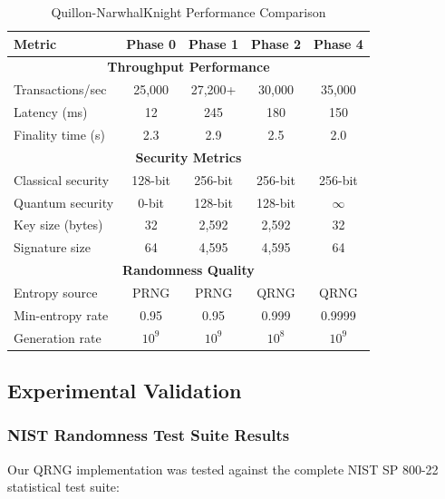 \documentclass[11pt,a4paper]{article}
\begin{document}
\begin{table}[H]
\centering
\caption{Quillon-NarwhalKnight Performance Comparison}
\begin{tabular}{|l|c|c|c|c|}
\hline
\textbf{Metric} & \textbf{Phase 0} & \textbf{Phase 1} & \textbf{Phase 2} & \textbf{Phase 4} \\
\hline
\multicolumn{5}{|c|}{\textbf{Throughput Performance}} \\
\hline
Transactions/sec & 25,000 & 27,200+ & 30,000 & 35,000 \\
Latency (ms) & 12 & 245 & 180 & 150 \\
Finality time (s) & 2.3 & 2.9 & 2.5 & 2.0 \\
\hline
\multicolumn{5}{|c|}{\textbf{Security Metrics}} \\
\hline
Classical security & 128-bit & 256-bit & 256-bit & 256-bit \\
Quantum security & 0-bit & 128-bit & 128-bit & $\infty$ \\
Key size (bytes) & 32 & 2,592 & 2,592 & 32 \\
Signature size & 64 & 4,595 & 4,595 & 64 \\
\hline
\multicolumn{5}{|c|}{\textbf{Randomness Quality}} \\
\hline
Entropy source & PRNG & PRNG & QRNG & QRNG \\
Min-entropy rate & 0.95 & 0.95 & 0.999 & 0.9999 \\
Generation rate & $10^9$ & $10^9$ & $10^8$ & $10^9$ \\
\hline
\end{tabular}
\label{tab:comprehensive-performance}
\end{table}

\subsection{Experimental Validation}

\subsubsection{NIST Randomness Test Suite Results}

Our QRNG implementation was tested against the complete NIST SP 800-22 statistical test suite:
\end{document}
